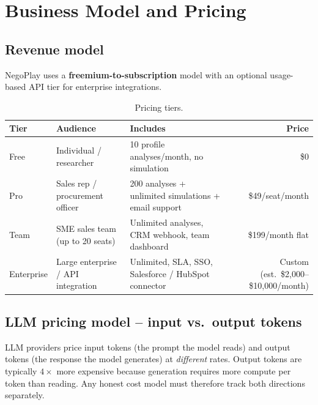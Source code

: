 \documentclass[11pt, a4paper, oneside]{report}
\begin{document}
\chapter{Business Model and Pricing}
\label{ch:bizmodel}

\section{Revenue model}

NegoPlay uses a \textbf{freemium-to-subscription} model with an optional
usage-based API tier for enterprise integrations.

\begin{table}[H]
\centering\small
\caption{Pricing tiers.}
\begin{tabularx}{\textwidth}{l l X r}
\toprule
\textbf{Tier} & \textbf{Audience} & \textbf{Includes} & \textbf{Price} \\
\midrule
Free          & Individual / researcher
              & 10 profile analyses/month, no simulation
              & \$0 \\
Pro           & Sales rep / procurement officer
              & 200 analyses + unlimited simulations + email support
              & \$49/seat/month \\
Team          & SME sales team (up to 20 seats)
              & Unlimited analyses, CRM webhook, team dashboard
              & \$199/month flat \\
Enterprise    & Large enterprise / API integration
              & Unlimited, SLA, SSO, Salesforce / HubSpot connector
              & Custom (est.\ \$2{,}000--\$10{,}000/month) \\
\bottomrule
\end{tabularx}
\end{table}

\section{LLM pricing model -- input vs.\ output tokens}

LLM providers price input tokens (the prompt the model reads) and
output tokens (the response the model generates) at \emph{different}
rates. Output tokens are typically $4\times$ more expensive because
generation requires more compute per token than reading. Any honest
cost model must therefore track both directions separately.
\end{document}
